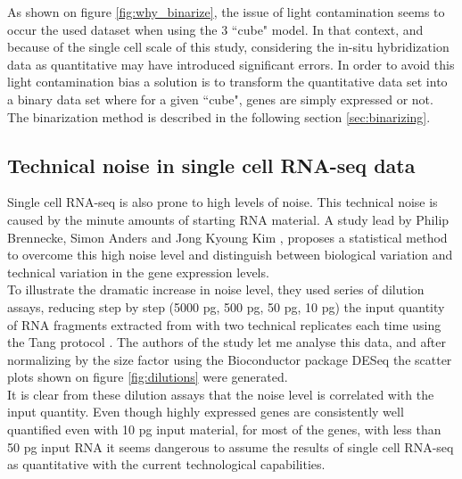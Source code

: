   As shown on figure \ref{fig:why_binarize}, the issue of light contamination seems to occur the used dataset when using the 3  ``cube" model. In that context, and because of the single cell scale of this study, considering the in-situ hybridization data as quantitative may have introduced significant errors. In order to avoid this light contamination bias a solution is to transform the quantitative data set into a binary data set where for a given ``cube", genes are simply expressed or not. The binarization method is described in the following section \ref{sec:binarizing}.
  


  \subsection{Technical noise in single cell RNA-seq data}
  Single cell RNA-seq is also prone to high levels of noise. This technical noise is caused by the minute amounts of starting RNA material. A study lead by Philip Brennecke, Simon Anders and Jong Kyoung Kim \cite{brennecke13}, proposes a statistical method to overcome this high noise level and distinguish between biological variation and technical variation in the gene expression levels.\\
  
  To illustrate the dramatic increase in noise level, they used series of dilution assays, reducing step by step (5000 pg, 500 pg, 50 pg, 10 pg) the input quantity of RNA fragments extracted from  with two technical replicates each time using the Tang protocol \cite{tang09}. The authors of the study let me analyse this data, and after normalizing by the size factor using the Bioconductor package DESeq \cite{anders10} the scatter plots shown on figure \ref{fig:dilutions} were generated. \\
  
  It is clear from these dilution assays that the noise level is correlated with the input quantity. Even though highly expressed genes are consistently well quantified even with 10 pg input material, for most of the genes, with less than 50 pg input RNA it seems dangerous to assume the results of single cell RNA-seq as quantitative with the current technological capabilities.
  
